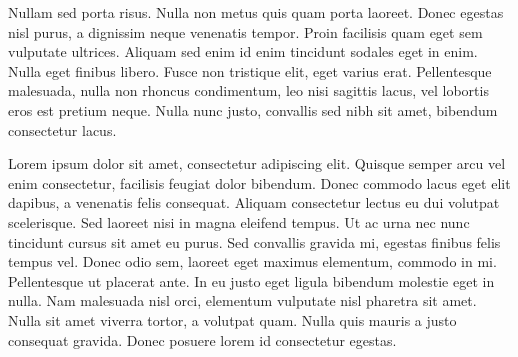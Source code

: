 Nullam sed porta risus. Nulla non metus quis quam porta laoreet. Donec egestas nisl purus, a dignissim neque venenatis tempor. Proin facilisis quam eget sem vulputate ultrices. Aliquam sed enim id enim tincidunt sodales eget in enim. Nulla eget finibus libero. Fusce non tristique elit, eget varius erat. Pellentesque malesuada, nulla non rhoncus condimentum, leo nisi sagittis lacus, vel lobortis eros est pretium neque. Nulla nunc justo, convallis sed nibh sit amet, bibendum consectetur lacus.

Lorem ipsum dolor sit amet, consectetur adipiscing elit. Quisque semper arcu vel enim consectetur, facilisis feugiat dolor bibendum. Donec commodo lacus eget elit dapibus, a venenatis felis consequat. Aliquam consectetur lectus eu dui volutpat scelerisque. Sed laoreet nisi in magna eleifend tempus. Ut ac urna nec nunc tincidunt cursus sit amet eu purus. Sed convallis gravida mi, egestas finibus felis tempus vel. Donec odio sem, laoreet eget maximus elementum, commodo in mi. Pellentesque ut placerat ante. In eu justo eget ligula bibendum molestie eget in nulla. Nam malesuada nisl orci, elementum vulputate nisl pharetra sit amet. Nulla sit amet viverra tortor, a volutpat quam. Nulla quis mauris a justo consequat gravida. Donec posuere lorem id consectetur egestas.